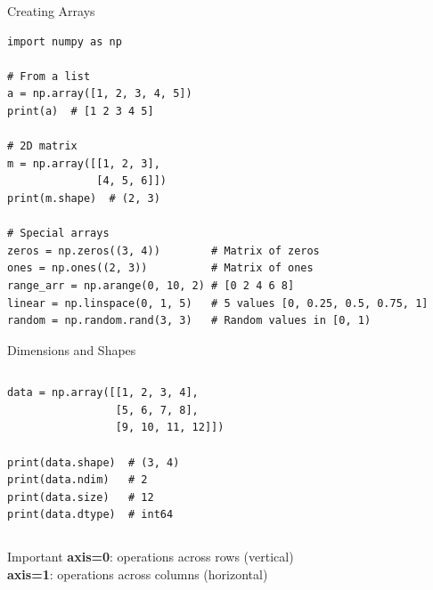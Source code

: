 \documentclass[aspectratio=169]{beamer}
\begin{document}
\begin{frame}[fragile]{Creating Arrays}
\begin{lstlisting}
import numpy as np

# From a list
a = np.array([1, 2, 3, 4, 5])
print(a)  # [1 2 3 4 5]

# 2D matrix
m = np.array([[1, 2, 3],
              [4, 5, 6]])
print(m.shape)  # (2, 3)

# Special arrays
zeros = np.zeros((3, 4))        # Matrix of zeros
ones = np.ones((2, 3))          # Matrix of ones
range_arr = np.arange(0, 10, 2) # [0 2 4 6 8]
linear = np.linspace(0, 1, 5)   # 5 values [0, 0.25, 0.5, 0.75, 1]
random = np.random.rand(3, 3)   # Random values in [0, 1)
\end{lstlisting}
\end{frame}

\begin{frame}[fragile]{Dimensions and Shapes}
\begin{columns}[T]
\begin{lstlisting}
data = np.array([[1, 2, 3, 4],
                 [5, 6, 7, 8],
                 [9, 10, 11, 12]])

print(data.shape)  # (3, 4)
print(data.ndim)   # 2
print(data.size)   # 12
print(data.dtype)  # int64
\end{lstlisting}

\begin{center}
\end{center}
\end{columns}

\vspace{0.3cm}
\begin{alertblock}{Important}
\textbf{axis=0}: operations across rows (vertical) \\
\textbf{axis=1}: operations across columns (horizontal)
\end{alertblock}
\end{frame}
\end{document}
